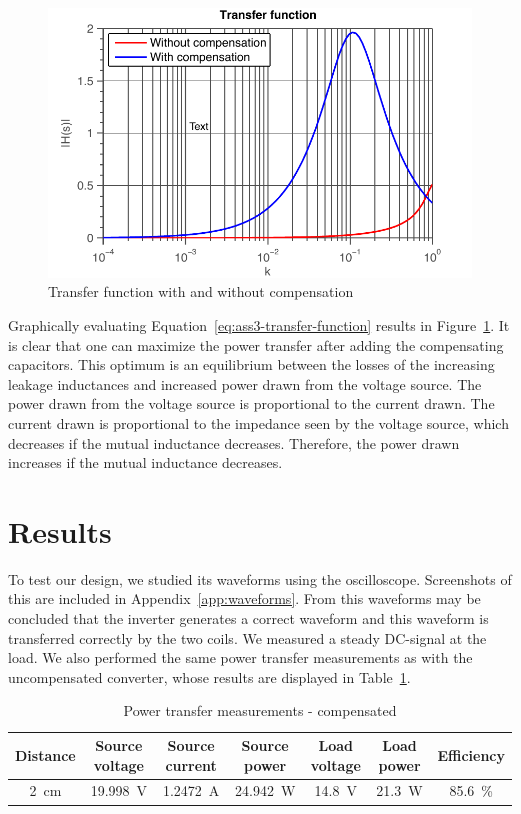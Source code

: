 \documentclass[11pt,titlepage]{report}
\begin{document}
\begin{figure}[H]
	\begin{center}
		\includegraphics[width=0.8\linewidth]{resource/transfer-function-rc.pdf}
	\end{center}
	\caption{Transfer function with and without compensation}
	\label{fig:ass3-transfer-function}
\end{figure}

Graphically evaluating Equation~\ref{eq:ass3-transfer-function} results in Figure~\ref{fig:ass3-transfer-function}. It is clear that one can maximize the power transfer after adding the compensating capacitors. This optimum is an equilibrium between the losses of the increasing leakage inductances and increased power drawn from the voltage source. The power drawn from the voltage source is proportional to the current drawn. The current drawn is proportional to the impedance seen by the voltage source, which decreases if the mutual inductance decreases. Therefore, the power drawn increases if the mutual inductance decreases.

\section{Results}
To test our design, we studied its waveforms using the oscilloscope. Screenshots of this are included in Appendix~\ref{app:waveforms}. From this waveforms may be concluded that the inverter generates a correct waveform and this waveform is transferred correctly by the two coils. We measured a steady DC-signal at the load. We also performed the same power transfer measurements as with the uncompensated converter, whose results are displayed in Table~\ref{tab:ass3-power}.

\begin{table}[H]
	\centering
	\caption{Power transfer measurements - compensated}
	\label{tab:ass3-power}
	\begin{tabular}{c c c c c c c}
		\hline\hline
		Distance & Source voltage & Source current & Source power & Load voltage & Load power & Efficiency \\
		\hline
		\SI{2}{cm} & \SI{19.998}{V} & \SI{1.2472}{A} & \SI{24.942}{W} & \SI{14.8}{V} & \SI{21.3}{W} & \SI{85.6}{\percent} \\
		\hline
		\end{tabular}
\end{table}
\end{document}
